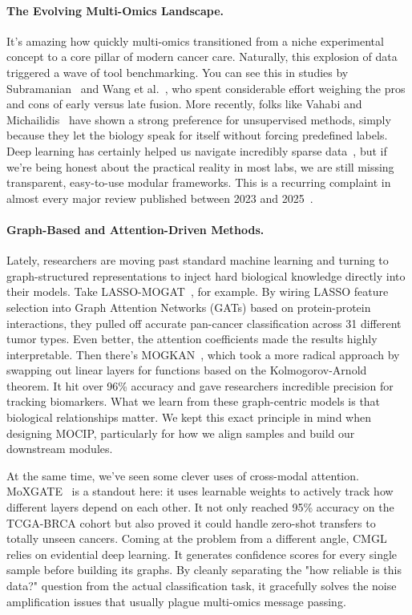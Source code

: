 \documentclass[runningheads]{llncs}
\begin{document}
\paragraph{The Evolving Multi-Omics Landscape.}
It's amazing how quickly multi-omics transitioned from a niche experimental concept to a core pillar of modern cancer care. Naturally, this explosion of data triggered a wave of tool benchmarking. You can see this in studies by Subramanian~\cite{subramanian2020} and Wang et al.~\cite{wang2021evaluation}, who spent considerable effort weighing the pros and cons of early versus late fusion. More recently, folks like Vahabi and Michailidis~\cite{vahabi2022unsupervised} have shown a strong preference for unsupervised methods, simply because they let the biology speak for itself without forcing predefined labels. Deep learning has certainly helped us navigate incredibly sparse data~\cite{kang2022roadmap}, but if we're being honest about the practical reality in most labs, we are still missing transparent, easy-to-use modular frameworks. This is a recurring complaint in almost every major review published between 2023 and 2025~\cite{wekesa2023review,abdelaziz2024multi,muneer2025review}.

\paragraph{Graph-Based and Attention-Driven Methods.}
Lately, researchers are moving past standard machine learning and turning to graph-structured representations to inject hard biological knowledge directly into their models. Take LASSO-MOGAT~\cite{alharbi2024lassomogat}, for example. By wiring LASSO feature selection into Graph Attention Networks (GATs) based on protein-protein interactions, they pulled off accurate pan-cancer classification across 31 different tumor types. Even better, the attention coefficients made the results highly interpretable. Then there's MOGKAN~\cite{alharbi2025mogkan}, which took a more radical approach by swapping out linear layers for functions based on the Kolmogorov-Arnold theorem. It hit over 96\% accuracy and gave researchers incredible precision for tracking biomarkers. What we learn from these graph-centric models is that biological relationships matter. We kept this exact principle in mind when designing MOCIP, particularly for how we align samples and build our downstream modules.

At the same time, we've seen some clever uses of cross-modal attention. MoXGATE~\cite{dip2025moxgate} is a standout here: it uses learnable weights to actively track how different layers depend on each other. It not only reached 95\% accuracy on the TCGA-BRCA cohort but also proved it could handle zero-shot transfers to totally unseen cancers. Coming at the problem from a different angle, CMGL~\cite{fan2026cmgl} relies on evidential deep learning. It generates confidence scores for every single sample before building its graphs. By cleanly separating the "how reliable is this data?" question from the actual classification task, it gracefully solves the noise amplification issues that usually plague multi-omics message passing.
\end{document}
